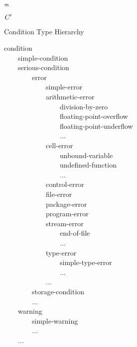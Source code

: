 {\newpage
\clearpage
\samepage \({}_{\hbox{\scriptsize\it m}}\)
}

{\newpage
\clearpage
\samepage ${\it C}'$
}

{\newpage
\clearpage
\samepage \begin{table}%
[t]
\caption{Condition Type Hierarchy}
\label{CONDITION-HIERARCHY-TABLE}
\begin{lisp}
condition \\ 
~~~~simple-condition \\ 
~~~~serious-condition \\ 
~~~~~~~~error \\ 
~~~~~~~~~~~~simple-error \\ 
~~~~~~~~~~~~arithmetic-error \\ 
~~~~~~~~~~~~~~~~division-by-zero \\ 
~~~~~~~~~~~~~~~~floating-point-overflow \\ 
~~~~~~~~~~~~~~~~floating-point-underflow \\ 
~~~~~~~~~~~~~~~~... \\ 
~~~~~~~~~~~~cell-error \\ 
~~~~~~~~~~~~~~~~unbound-variable \\ 
~~~~~~~~~~~~~~~~undefined-function \\ 
~~~~~~~~~~~~~~~~... \\ 
~~~~~~~~~~~~control-error \\ 
~~~~~~~~~~~~file-error \\ 
~~~~~~~~~~~~package-error \\ 
~~~~~~~~~~~~program-error \\ 
~~~~~~~~~~~~stream-error \\ 
~~~~~~~~~~~~~~~~end-of-file \\ 
~~~~~~~~~~~~~~~~... \\ 
~~~~~~~~~~~~type-error \\ 
~~~~~~~~~~~~~~~~simple-type-error \\ 
~~~~~~~~~~~~~~~~... \\ 
~~~~~~~~~~~~... \\ 
~~~~~~~~storage-condition \\ 
~~~~~~~~... \\ 
~~~~warning \\ 
~~~~~~~~simple-warning \\ 
~~~~~~~~... \\ 
~~~~...
\end{lisp}
\vfill
\end{table}
}

